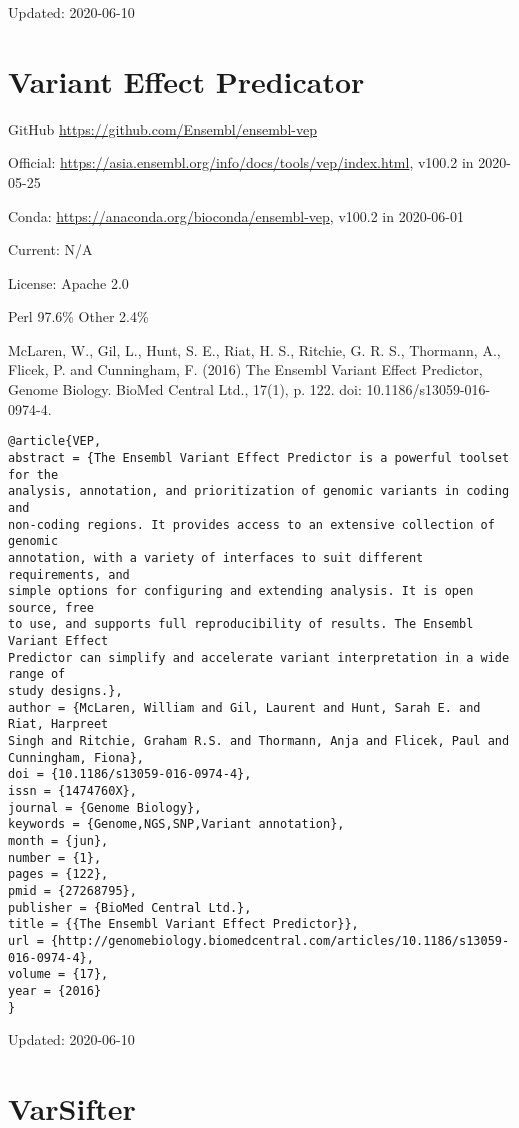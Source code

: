 \documentclass[]{article}
\begin{document}
Updated: 2020-06-10


\section{Variant Effect Predicator}

GitHub \url{https://github.com/Ensembl/ensembl-vep}

Official: \url{https://asia.ensembl.org/info/docs/tools/vep/index.html}, v100.2 in 2020-05-25

Conda: \url{https://anaconda.org/bioconda/ensembl-vep}, v100.2 in 2020-06-01

Current: N/A

License: Apache 2.0

Perl 97.6\% Other 2.4\%

McLaren, W., Gil, L., Hunt, S. E., Riat, H. S., Ritchie, G. R. S., Thormann, A., Flicek, P. and Cunningham, F. (2016) The Ensembl Variant Effect Predictor, Genome Biology. BioMed Central Ltd., 17(1), p. 122. doi: 10.1186/s13059-016-0974-4.

\begin{verbatim}
@article{VEP,
abstract = {The Ensembl Variant Effect Predictor is a powerful toolset for the
analysis, annotation, and prioritization of genomic variants in coding and
non-coding regions. It provides access to an extensive collection of genomic
annotation, with a variety of interfaces to suit different requirements, and
simple options for configuring and extending analysis. It is open source, free
to use, and supports full reproducibility of results. The Ensembl Variant Effect
Predictor can simplify and accelerate variant interpretation in a wide range of
study designs.},
author = {McLaren, William and Gil, Laurent and Hunt, Sarah E. and Riat, Harpreet
Singh and Ritchie, Graham R.S. and Thormann, Anja and Flicek, Paul and
Cunningham, Fiona},
doi = {10.1186/s13059-016-0974-4},
issn = {1474760X},
journal = {Genome Biology},
keywords = {Genome,NGS,SNP,Variant annotation},
month = {jun},
number = {1},
pages = {122},
pmid = {27268795},
publisher = {BioMed Central Ltd.},
title = {{The Ensembl Variant Effect Predictor}},
url = {http://genomebiology.biomedcentral.com/articles/10.1186/s13059-016-0974-4},
volume = {17},
year = {2016}
}
\end{verbatim}

Updated: 2020-06-10

\section{VarSifter}
\end{document}
